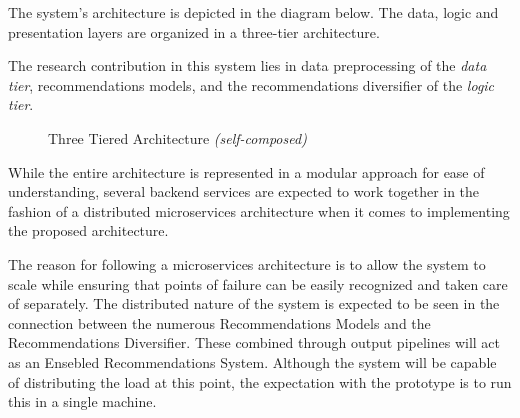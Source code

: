 The system's architecture is depicted in the diagram below. The data, logic and presentation layers are organized in a three-tier architecture.

The research contribution in this system lies in data preprocessing of the \textit{data tier}, recommendations models, and the recommendations diversifier of the \textit{logic tier}.


\begin{figure}[h!]
\centering
{}
\caption{Three Tiered Architecture \textit{(self-composed)}}
\label{fig:three-tiered-architecuture}
\end{figure}

While the entire architecture is represented in a modular approach for ease of understanding, several backend services are expected to work together in the fashion of a distributed microservices architecture when it comes to implementing the proposed architecture.

The reason for following a microservices architecture is to allow the system to scale while ensuring that points of failure can be easily recognized and taken care of separately. The distributed nature of the system is expected to be seen in the connection between the numerous Recommendations Models and the Recommendations Diversifier. These combined through output pipelines will act as an Ensebled Recommendations System. Although the system will be capable of distributing the load at this point, the expectation with the prototype is to run this in a single machine.

